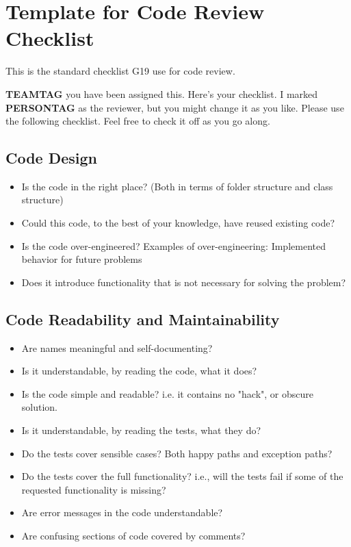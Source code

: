 \chapter{Template for Code Review Checklist} \label{app:code-review-checklist}

This is the standard checklist \gls{G19} use for code review.

\textbf{TEAMTAG} you have been assigned this. Here's your checklist. I
marked \textbf{PERSONTAG} as the reviewer, but you might change it as you
like. Please use the following checklist. Feel free to check it off as
you go along.

\section{Code Design}
\begin{itemize}
\item Is the code in the right place? (Both in terms of folder
 structure and class structure)
\item Could this code, to the best of your knowledge, have reused
 existing code?
\item Is the code over-engineered? Examples of over-engineering:
 Implemented behavior for future problems
\item Does it introduce functionality that is not necessary for
 solving the problem?
\end{itemize}

\section{Code Readability and Maintainability}
\begin{itemize}
\item Are names meaningful and self-documenting?
\item Is it understandable, by reading the code, what it does?
\item Is the code simple and readable? i.e. it contains no "hack",
 or obscure solution.
\item Is it understandable, by reading the tests, what they do?
\item Do the tests cover sensible cases? Both happy paths and
 exception paths?
\item Do the tests cover the full functionality? i.e., will the
 tests fail if some of the requested functionality is missing?
\item Are error messages in the code understandable?
\item Are confusing sections of code covered by comments?
\end{itemize}


